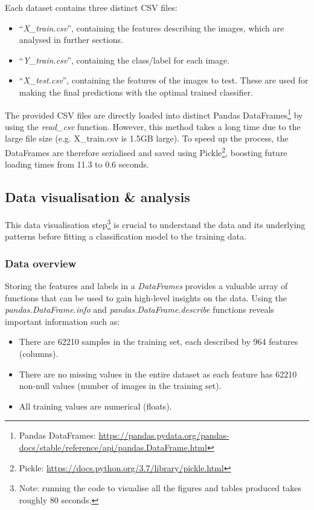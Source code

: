 \documentclass[letterpaper,12pt]{article}
\begin{document}
Each dataset contains three distinct CSV files:
\begin{itemize}
    \item ``\textit{X\_train.csv}'', containing the features describing the images, which are analysed in further sections.
    \item ``\textit{Y\_train.csv}'', containing the class/label for each image.
    \item ``\textit{X\_test.csv}'', containing the features of the images to test. These are used for making the final predictions with the optimal trained classifier.
\end{itemize}

The provided CSV files are directly loaded into distinct Pandas DataFrames\footnote{Pandas DataFrames: \url{https://pandas.pydata.org/pandas-docs/stable/reference/api/pandas.DataFrame.html}} by using the \textit{read\_csv} function. However, this method takes a long time due to the large file size (e.g. X\_train.csv is 1.5GB large). To speed up the process, the DataFrames are therefore serialised and saved using Pickle\footnote{Pickle: \url{https://docs.python.org/3.7/library/pickle.html}}, boosting future loading times from 11.3 to 0.6 seconds.


\subsection{Data visualisation \& analysis}

This data visualisation step\footnote{Note: running the code to visualise all the figures and tables produced takes roughly 80 seconds.} is crucial to understand the data and its underlying patterns before fitting a classification model to the training data.

\subsubsection{Data overview}

Storing the features and labels in a \textit{DataFrames} provides a valuable array of functions that can be used to gain high-level insights on the data. Using the \textit{pandas.DataFrame.info} and \textit{pandas.DataFrame.describe} functions reveals important information such as:
\begin{itemize}
    \item There are 62210 samples in the training set, each described by 964 features (columns).
    \item There are no missing values in the entire dataset as each feature has 62210 non-null values (number of images in the training set).
    \item All training values are numerical (floats).
\end{itemize}
\end{document}
